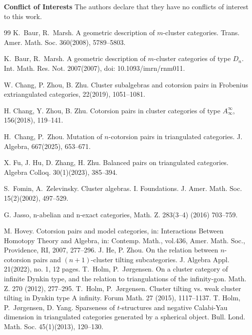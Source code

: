 \documentclass[a4paper,reqno,11pt]{amsart}
\theoremstyle{definition}
\begin{document}
\hspace{-5mm}\textbf{Conflict of Interests}\hspace{2mm} The authors declare that they have no conflicts of interest to this work.







\begin{thebibliography}{99}
%
 K.~Baur, R.~Marsh. A geometric description of $m$-cluster categories. Trans. Amer. Math. Soc. 360(2008), 5789--5803.

 K.~Baur, R.~Marsh. A geometric description of $m$-cluster categories of type $D_n$. Int. Math. Res. Not. 2007(2007), doi: 10.1093/imrn/rnm011.

 W. Chang, P. Zhou, B. Zhu. Cluster subalgebras and cotorsion pairs in Frobenius extriangulated
categories, 22(2019), 1051--1081.

 H. Chang, Y. Zhou, B. Zhu. Cotorsion pairs in cluster categories of type $A^{\infty}_{\infty}$, 156(2018), 119--141.

 H.~Chang, P.~Zhou. Mutation of $n$-cotorsion pairs in triangulated categories. J. Algebra, 667(2025), 653--671.

 X. Fu, J. Hu, D. Zhang, H. Zhu. Balanced pairs on triangulated categories.
Algebra Colloq. 30(1)(2023), 385--394.

 S.~Fomin, A.~Zelevinsky. Cluster algebras. I. Foundations. J. Amer. Math. Soc. 15(2)(2002), 497--529.

 G. Jasso, n-abelian and n-exact categories, Math. Z. 283(3–4) (2016) 703–759.

 M. Hovey.  Cotorsion pairs and model categories, in: Interactions Between Homotopy Theory and Algebra, in: Contemp. Math., vol.436, Amer. Math. Soc., Providence, RI, 2007, 277--296.
%
 J. He, P. Zhou. On the relation between $n$-cotorsion pairs and $(n + 1)$-cluster tilting
subcategories. J. Algebra Appl. 21(2022), no. 1, 12 pages.
%
 T.~Holm, P.~J{\o}rgensen. On a  cluster category of infinite Dynkin type, and the relation to triangulations of the infinity-gon. Math. Z. 270 (2012), 277--295.
 T.~Holm, P.~J{\o}rgensen. Cluster tilting vs. weak cluster tilting in Dynkin type A infinity. Forum Math. 27 (2015), 1117--1137.
%
 T. Holm, P.~J{\o}rgensen, D. Yang. Sparseness of $t$-structures and negative Calabi-Yau dimension in triangulated categories generated by a spherical object. Bull. Lond.
Math. Soc. 45(1)(2013),  120--130.



\end{thebibliography}
\end{document}
